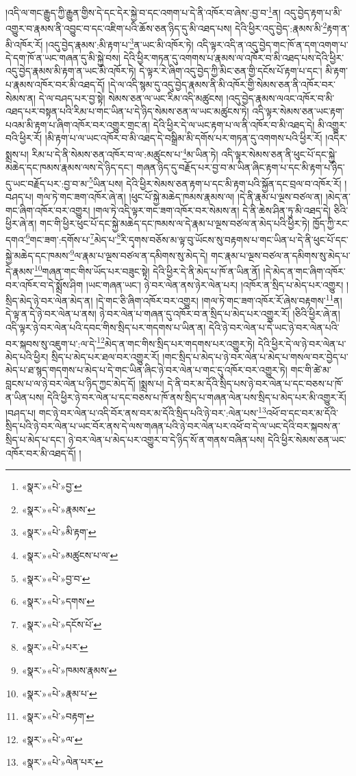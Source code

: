 །འདི་ལ་གང་རྒྱུད་ཀྱི་རྒྱུན་གྱིས་དེ་དང་དེར་སྐྱེ་བ་དང་འགག་པ་དེ་ནི་འཁོར་བ་ཞེས་:བྱ་བ་\footnote{«སྣར་»«པེ་»བྱ་}ན། འདུ་བྱེད་རྟག་པ་མི་འགྱུར་བ་རྣམས་ནི་འབྱུང་བ་དང་འཇིག་པའི་ཆོས་ཅན་ཉིད་དུ་མི་འཐད་པས། དེའི་ཕྱིར་འདུ་བྱེད་:རྣམས་མི་\footnote{«སྣར་»«པེ་»རྣམས་}རྟག་ན་མི་འཁོར་རོ། །འདུ་བྱེད་རྣམས་:མི་རྟག་པ་\footnote{«སྣར་»«པེ་»མི་རྟག་}ན་ཡང་མི་འཁོར་ཏེ། འདི་ལྟར་འདི་ན་འདུ་བྱེད་གང་ཁོ་ན་དག་འགག་པ་དེ་དག་ཁོ་ན་ཡང་གཞན་དུ་མི་སྐྱེ་བས། དེའི་ཕྱིར་གཏན་དུ་འགགས་པ་རྣམས་ལ་འཁོར་བ་མི་འཐད་པས་དེའི་ཕྱིར་འདུ་བྱེད་རྣམས་མི་རྟག་ན་ཡང་མི་འཁོར་ཏེ། དེ་ལྟར་རེ་ཞིག་འདུ་བྱེད་ཀྱི་མིང་ཅན་གྱི་དངོས་པོ་རྟག་པ་དང་། མི་རྟག་པ་རྣམས་འཁོར་བར་མི་འཐད་དོ། །དེ་ལ་འདི་སྙམ་དུ་འདུ་བྱེད་རྣམས་ནི་མི་འཁོར་གྱི་སེམས་ཅན་ནི་འཁོར་བར་སེམས་ན། དེ་ལ་བཤད་པར་བྱ་སྟེ། སེམས་ཅན་ལ་ཡང་རིམ་འདི་མཚུངས། །འདུ་བྱེད་རྣམས་ལའང་འཁོར་བ་མི་འཐད་པར་བསྟན་པའི་རིམ་པ་གང་ཡིན་པ་དེ་ཉིད་སེམས་ཅན་ལ་ཡང་མཚུངས་ཏེ། འདི་ལྟར་སེམས་ཅན་ཡང་རྟག་པའམ་མི་རྟག་པ་ཞིག་འཁོར་བར་འགྱུར་གྲང་ན། དེའི་ཕྱིར་དེ་ལ་ཡང་རྟག་པ་ལ་ནི་འཁོར་བ་མི་འཐད་དེ། མི་འགྱུར་བའི་ཕྱིར་རོ། །མི་རྟག་པ་ལ་ཡང་འཁོར་བ་མི་འཐད་དེ་བསྒྲིམ་མི་དགོས་པར་གཏན་དུ་འགགས་པའི་ཕྱིར་རོ། །འདིར་སྨྲས་པ། རིམ་པ་དེ་ནི་སེམས་ཅན་འཁོར་བ་ལ་:མཚུངས་པ་\footnote{«སྣར་»«པེ་»མཚུངས་པ་ལ་}མ་ཡིན་ཏེ། འདི་ལྟར་སེམས་ཅན་ནི་ཕུང་པོ་དང་སྐྱེ་མཆེད་དང་ཁམས་རྣམས་ལས་དེ་ཉིད་དང་། གཞན་ཉིད་དུ་བརྗོད་པར་བྱ་བ་མ་ཡིན་ཞིང་རྟག་པ་དང་མི་རྟག་པ་ཉིད་དུ་ཡང་བརྗོད་པར་:བྱ་བ་མ་\footnote{«སྣར་»«པེ་»བྱ་བ་}ཡིན་པས། དེའི་ཕྱིར་སེམས་ཅན་རྟག་པ་དང་མི་རྟག་པའི་སྐྱོན་དང་བྲལ་བ་འཁོར་རོ། །བཤད་པ། གལ་ཏེ་གང་ཟག་འཁོར་ཞེ་ན། །ཕུང་པོ་སྐྱེ་མཆེད་ཁམས་རྣམས་ལ། །དེ་ནི་རྣམ་པ་ལྔས་བཙལ་ན། །མེད་ན་གང་ཞིག་འཁོར་བར་འགྱུར། །གལ་ཏེ་འདི་ལྟར་གང་ཟག་འཁོར་བར་སེམས་ན། དེ་ནི་ཆེས་ཤིན་ཏུ་མི་འཐད་དེ། ཅིའི་ཕྱིར་ཞེ་ན། གང་གི་ཕྱིར་ཕུང་པོ་དང་སྐྱེ་མཆེད་དང་ཁམས་ལ་དེ་རྣམ་པ་ལྔས་བཙལ་ན་མེད་པའི་ཕྱིར་ཏེ། ཁྱོད་ཀྱི་རང་དགའ་\footnote{«སྣར་»«པེ་»དགས་}གང་ཟག་:དགོས་པ་\footnote{«སྣར་»«པེ་»དངོས་པོ་}མེད་པ་\footnote{«སྣར་»«པེ་»པར་}རི་དྭགས་བཅོས་མ་ལྟ་བུ་ཡོངས་སུ་བརྟགས་པ་གང་ཡིན་པ་དེ་ནི་ཕུང་པོ་དང་སྐྱེ་མཆེད་དང་ཁམས་\footnote{«སྣར་»«པེ་»ཁམས་རྣམས་}ལ་རྣམ་པ་ལྔས་བཙལ་ན་དམིགས་སུ་མེད་དེ། གང་རྣམ་པ་ལྔས་བཙལ་ན་དམིགས་སུ་མེད་པ་དེ་རྣམས་\footnote{«སྣར་»«པེ་»རྣམ་པ་}གཞན་གང་གིས་ཡོད་པར་བཟུང་སྟེ། དེའི་ཕྱིར་དེ་ནི་མེད་པ་ཁོ་ན་ཡིན་ནོ། །དེ་མེད་ན་གང་ཞིག་འཁོར་བར་འཁོར་བ་དེ་སྨྲོས་ཤིག །ཡང་གཞན་ཡང་། ཉེ་བར་ལེན་ནས་ཉེར་ལེན་པར། །འཁོར་ན་སྲིད་པ་མེད་པར་འགྱུར། །སྲིད་མེད་ཉེ་བར་ལེན་མེད་ན། །དེ་གང་ཅི་ཞིག་འཁོར་བར་འགྱུར། །གལ་ཏེ་གང་ཟག་འཁོར་རོ་ཞེས་བརྟགས་\footnote{«སྣར་»«པེ་»བརྟག་}ན། དེ་ལྟ་ན་དེ་ཉེ་བར་ལེན་པ་ནས། ཉེ་བར་ལེན་པ་གཞན་དུ་འཁོར་བ་ན་སྲིད་པ་མེད་པར་འགྱུར་རོ། །ཅིའི་ཕྱིར་ཞེ་ན། འདི་ལྟར་ཉེ་བར་ལེན་པའི་དབང་གིས་སྲིད་པར་གདགས་པ་ཡིན་ན། དེའི་ཉེ་བར་ལེན་པ་དེ་ཡང་ཉེ་བར་ལེན་པའི་བར་སྐབས་སུ་འཇུག་པ་:ལ་དེ་\footnote{«སྣར་»«པེ་»ལ་}མེད་ན་གང་གིས་སྲིད་པར་གདགས་པར་འགྱུར་ཏེ། དེའི་ཕྱིར་དེ་ལ་ཉེ་བར་ལེན་པ་མེད་པའི་ཕྱིར། སྲིད་པ་མེད་པར་ཐལ་བར་འགྱུར་རོ། །གང་སྲིད་པ་མེད་པ་ཉེ་བར་ལེན་པ་མེད་པ་གསལ་བར་བྱེད་པ་མེད་པ་ཐ་སྙད་གདགས་པ་མེད་པ་དེ་གང་ཡིན་ཞིང་ཉེ་བར་ལེན་པ་གང་དུ་འཁོར་བར་འགྱུར་ཏེ། གང་གི་ཚེ་མ་བླངས་པ་ལ་ཉེ་བར་ལེན་པ་ཉིད་ཀྱང་མེད་དོ། །སྨྲས་པ། དེ་ནི་བར་མ་དོའི་སྲིད་པས་ཉེ་བར་ལེན་པ་དང་བཅས་པ་ཁོ་ན་ཡིན་པས། དེའི་ཕྱིར་ཉེ་བར་ལེན་པ་དང་བཅས་པ་ཁོ་ནས་སྲིད་པ་གཞན་ལེན་པས་སྲིད་པ་མེད་པར་མི་འགྱུར་རོ། །བཤད་པ། གང་ཉེ་བར་ལེན་པ་འདི་བོར་ནས་བར་མ་དོའི་སྲིད་པའི་ཉེ་བར་:ལེན་པས་\footnote{«སྣར་»«པེ་»ལེན་པར་}འཕོ་བ་དང་བར་མ་དོའི་སྲིད་པའི་ཉེ་བར་ལེན་པ་ཡང་བོར་ནས་དེ་ལས་གཞན་པའི་ཉེ་བར་ལེན་པར་འཕོ་བ་དེ་ལ་ཡང་དེའི་བར་སྐབས་ན་སྲིད་པ་མེད་པ་དང་། ཉེ་བར་ལེན་པ་མེད་པར་འགྱུར་བ་དེ་ཉིད་སོ་ན་གནས་བཞིན་པས། དེའི་ཕྱིར་སེམས་ཅན་ཡང་འཁོར་བར་མི་འཐད་དོ། །
